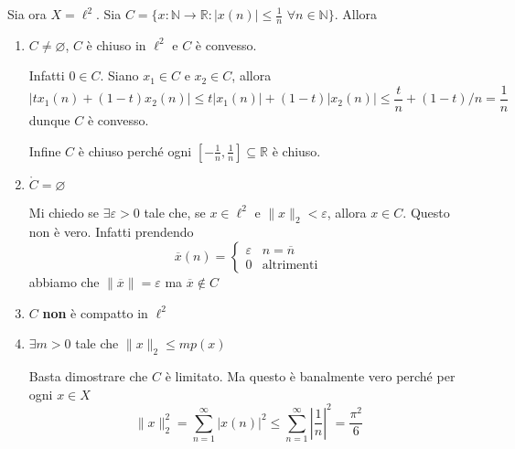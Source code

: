 Sia ora \(X = \ell^2\). Sia \(C = \{x : \mathbb{N} \to \mathbb{R}: |x{(n)}| \le \frac{1}{n} \,\, \forall n \in \mathbb{N}\}\). Allora
\begin{enumerate}[label = \arabic*.]
    \item \(C \neq \varnothing\), \(C\) è chiuso in \(\ell^2\) e \(C\) è
        convesso.

        Infatti \(0 \in C\). Siano \(x_{1} \in C\) e \(x_{2} \in C\), allora
        \[
          | tx_{1}{(n)} + {(1-t)}x_{2}{(n)}| \le t | x_{1}{(n)}| + {(1-t)} | x_{2}{(n)} | \le  \frac{t}{n} + (1-t)/n = \frac{1}{n}
        \]
        dunque \(C\) è convesso.

        Infine \(C\) è chiuso perché ogni \([-\frac{1}{n}, \frac{1}{n}] \subseteq \mathbb{R} \) è chiuso.
    \item \(\mathring{C} = \varnothing\) 

        Mi chiedo se \(\exists \varepsilon > 0\) tale che, se \(x \in \ell^2\) e
        \(\|x\|_2 < \varepsilon \), allora \(x \in C\). Questo non è vero.
        Infatti prendendo
        \[
          \overline{x}{(n)} = \begin{cases}{}
              \varepsilon & n = \overline{n} \\
              0 & \text{altrimenti}
          \end{cases}
        \]
        abbiamo che \(\|\overline{x}\| = \varepsilon\) ma \(\overline{x} \not\in C\) 
    \item \(C\) \textbf{non} è compatto in \(\ell^2\) 
    \item \(\exists m > 0\) tale che \(\|x\|_2 \le m p {(x)}\)

        Basta dimostrare che \(C\) è limitato. Ma questo è banalmente vero
        perché per ogni \(x \in X\) 
        \[
          \|x\|_2^2 = \sum_{n=1}^{\infty} |x{(n)}|^2 \le \sum_{n=1}^{\infty} \left|\frac{1}{n}\right|^2 = \frac{\pi^2}{6}  
        \]
\end{enumerate}





